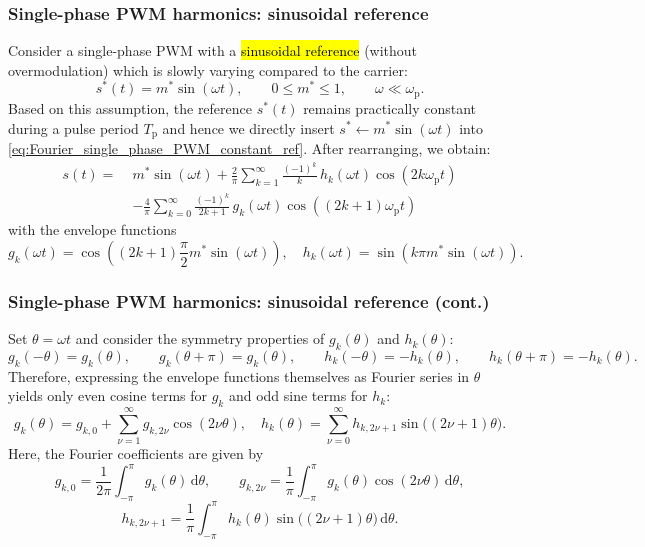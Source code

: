 \begin{frame}
    \frametitle{Single-phase PWM harmonics: sinusoidal reference}
    Consider a single-phase PWM with a \hl{sinusoidal reference} (without overmodulation) which is slowly varying compared to the carrier:
    \[
        s^*(t)=m^*\sin(\omega t), \qquad 0\leq m^*\leq 1, \qquad \omega\ll\omega_\mathrm{p}.
    \]
    Based on this assumption, the reference $s^*(t)$ remains practically constant during a pulse period $T_\mathrm{p}$ and hence we directly insert $s^* \leftarrow m^*\sin(\omega t)$ into \eqref{eq:Fourier_single_phase_PWM_constant_ref}. After rearranging, we obtain:
    \begin{equation}
        \begin{split}
            s(t)=\; & m^*\sin(\omega t)
            +\frac{2}{\pi}\sum_{k=1}^{\infty}\frac{(-1)^k}{k}\,h_k(\omega t)\cos\!\left(2k\omega_\mathrm{p}t\right) \\
                    & -\frac{4}{\pi}\sum_{k=0}^{\infty}\frac{(-1)^k}{2k+1}\,g_k(\omega t)
            \cos\!\left((2k+1)\omega_\mathrm{p}t\right)
        \end{split}
    \end{equation}
    with the envelope functions
    \begin{equation}
        g_k(\omega t)=\cos\!\left((2k+1)\frac{\pi}{2}m^*\sin(\omega t)\right), \quad h_k(\omega t)=\sin\!\left(k\pi m^*\sin(\omega t)\right).
    \end{equation}
\end{frame}

\begin{frame}
    \frametitle{Single-phase PWM harmonics: sinusoidal reference (cont.)}
    Set $\theta=\omega t$ and consider the symmetry properties of $g_k(\theta)$ and $h_k(\theta)$:
    \begin{equation*}
        g_k(-\theta)=g_k(\theta), \qquad g_k(\theta+\pi)=g_k(\theta),
        \qquad
        h_k(-\theta)=-h_k(\theta), \qquad h_k(\theta+\pi)=-h_k(\theta).
    \end{equation*}
    Therefore, expressing the envelope functions themselves as Fourier series in $\theta$ yields only even cosine terms for $g_k$ and odd sine terms for $h_k$:
    \begin{equation}
        g_k(\theta)=g_{k,0}+\sum_{\nu=1}^{\infty}g_{k,2\nu}\cos(2\nu\theta), \quad h_k(\theta)=\sum_{\nu=0}^{\infty}h_{k,2\nu+1}\sin\bigl((2\nu+1)\theta\bigr).
    \end{equation}
    Here, the Fourier coefficients are given by
    \[
        g_{k,0}=\frac{1}{2\pi}\int_{-\pi}^{\pi}g_k(\theta)\,\mathrm{d}\theta,
        \qquad
        g_{k,2\nu}=\frac{1}{\pi}\int_{-\pi}^{\pi}g_k(\theta)\cos(2\nu\theta)\,\mathrm{d}\theta,
    \]
    \[
        h_{k,2\nu+1}=\frac{1}{\pi}\int_{-\pi}^{\pi}h_k(\theta)\sin\bigl((2\nu+1)\theta\bigr)\,\mathrm{d}\theta.
    \]
\end{frame}

